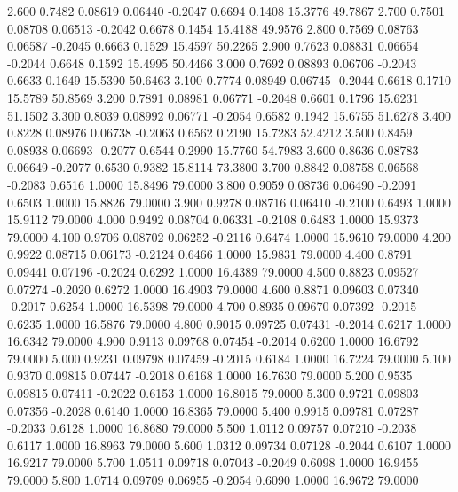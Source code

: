    2.600   0.7482   0.08619   0.06440  -0.2047   0.6694   0.1408  15.3776  49.7867
   2.700   0.7501   0.08708   0.06513  -0.2042   0.6678   0.1454  15.4188  49.9576
   2.800   0.7569   0.08763   0.06587  -0.2045   0.6663   0.1529  15.4597  50.2265
   2.900   0.7623   0.08831   0.06654  -0.2044   0.6648   0.1592  15.4995  50.4466
   3.000   0.7692   0.08893   0.06706  -0.2043   0.6633   0.1649  15.5390  50.6463
   3.100   0.7774   0.08949   0.06745  -0.2044   0.6618   0.1710  15.5789  50.8569
   3.200   0.7891   0.08981   0.06771  -0.2048   0.6601   0.1796  15.6231  51.1502
   3.300   0.8039   0.08992   0.06771  -0.2054   0.6582   0.1942  15.6755  51.6278
   3.400   0.8228   0.08976   0.06738  -0.2063   0.6562   0.2190  15.7283  52.4212
   3.500   0.8459   0.08938   0.06693  -0.2077   0.6544   0.2990  15.7760  54.7983
   3.600   0.8636   0.08783   0.06649  -0.2077   0.6530   0.9382  15.8114  73.3800
   3.700   0.8842   0.08758   0.06568  -0.2083   0.6516   1.0000  15.8496  79.0000
   3.800   0.9059   0.08736   0.06490  -0.2091   0.6503   1.0000  15.8826  79.0000
   3.900   0.9278   0.08716   0.06410  -0.2100   0.6493   1.0000  15.9112  79.0000
   4.000   0.9492   0.08704   0.06331  -0.2108   0.6483   1.0000  15.9373  79.0000
   4.100   0.9706   0.08702   0.06252  -0.2116   0.6474   1.0000  15.9610  79.0000
   4.200   0.9922   0.08715   0.06173  -0.2124   0.6466   1.0000  15.9831  79.0000
   4.400   0.8791   0.09441   0.07196  -0.2024   0.6292   1.0000  16.4389  79.0000
   4.500   0.8823   0.09527   0.07274  -0.2020   0.6272   1.0000  16.4903  79.0000
   4.600   0.8871   0.09603   0.07340  -0.2017   0.6254   1.0000  16.5398  79.0000
   4.700   0.8935   0.09670   0.07392  -0.2015   0.6235   1.0000  16.5876  79.0000
   4.800   0.9015   0.09725   0.07431  -0.2014   0.6217   1.0000  16.6342  79.0000
   4.900   0.9113   0.09768   0.07454  -0.2014   0.6200   1.0000  16.6792  79.0000
   5.000   0.9231   0.09798   0.07459  -0.2015   0.6184   1.0000  16.7224  79.0000
   5.100   0.9370   0.09815   0.07447  -0.2018   0.6168   1.0000  16.7630  79.0000
   5.200   0.9535   0.09815   0.07411  -0.2022   0.6153   1.0000  16.8015  79.0000
   5.300   0.9721   0.09803   0.07356  -0.2028   0.6140   1.0000  16.8365  79.0000
   5.400   0.9915   0.09781   0.07287  -0.2033   0.6128   1.0000  16.8680  79.0000
   5.500   1.0112   0.09757   0.07210  -0.2038   0.6117   1.0000  16.8963  79.0000
   5.600   1.0312   0.09734   0.07128  -0.2044   0.6107   1.0000  16.9217  79.0000
   5.700   1.0511   0.09718   0.07043  -0.2049   0.6098   1.0000  16.9455  79.0000
   5.800   1.0714   0.09709   0.06955  -0.2054   0.6090   1.0000  16.9672  79.0000
